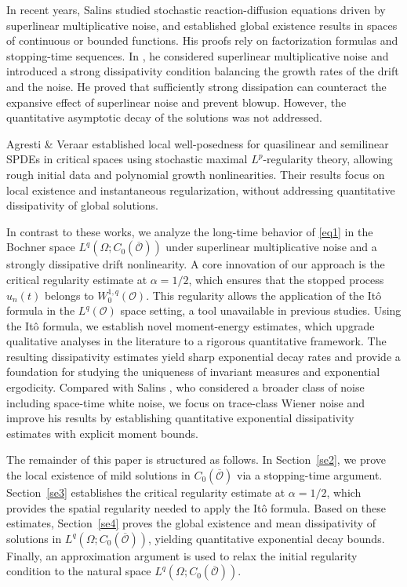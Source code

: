 \documentclass[10pt]{article}
\numberwithin{figure}{section}
\numberwithin{equation}{section}
\newcommand{\cO}{{\mathcal O}}
\newcommand{\0}{{\theta}}
\begin{document}
In recent years, Salins \cite{Salins2021,Salins2023,Salins2025,Salins2025'} studied stochastic reaction-diffusion equations driven by superlinear multiplicative noise, and established global existence results in spaces of continuous or bounded functions. His proofs rely on factorization formulas and stopping-time sequences. In \cite{Salins2021}, he considered superlinear multiplicative noise and introduced a strong dissipativity condition balancing the growth rates of the drift and the noise. He proved that sufficiently strong dissipation can counteract the expansive effect of superlinear noise and prevent blowup. However, the quantitative asymptotic decay of the solutions was not addressed.

Agresti \& Veraar \cite{Agresti2022a, Agresti2022b} established local well-posedness for quasilinear and semilinear SPDEs in critical spaces using stochastic maximal $L^p$-regularity theory, allowing rough initial data and polynomial growth nonlinearities. Their results focus on local existence and instantaneous regularization, without addressing quantitative dissipativity of global solutions.

In contrast to these works, we analyze the long-time behavior of \eqref{eq1} in the Bochner space $L^q(\Omega; C_0(\overline{\mathcal{O}}))$ under superlinear multiplicative noise and a strongly dissipative drift nonlinearity.
A core innovation of our approach is the critical regularity estimate at $\alpha = 1/2$, which ensures that the stopped process $u_n(t)$ belongs to $W^{1,q}_0(\cO)$.
This regularity allows the application of the It\^o formula in the $L^q(\cO)$ space setting, a tool unavailable in previous studies.
Using the It\^o formula, we establish novel moment-energy estimates, which upgrade qualitative analyses in the literature to a rigorous quantitative framework.
The resulting dissipativity estimates yield sharp exponential decay rates and provide a foundation for studying the uniqueness of invariant measures and exponential ergodicity.
Compared with Salins \cite{Salins2021}, who considered a broader class of noise including space-time white noise, we focus on trace-class Wiener noise and improve his results by establishing quantitative exponential dissipativity estimates with explicit moment bounds.%
 
The remainder of this paper is structured as follows. In Section~\ref{se2}, we prove the local existence of mild solutions in $C_0(\overline{\mathcal{O}})$ via a stopping-time argument. Section~\ref{se3} establishes the critical regularity estimate at $\alpha = 1/2$, which provides the spatial regularity needed to apply the It\^o formula. Based on these estimates, Section~\ref{se4} proves the global existence and mean dissipativity of solutions in $L^q(\Omega; C_0(\overline{\mathcal{O}}))$, yielding quantitative exponential decay bounds. Finally, an approximation argument is used to relax the initial regularity condition to the natural space $L^q(\Omega; C_0(\overline{\mathcal{O}}))$.
\end{document}
